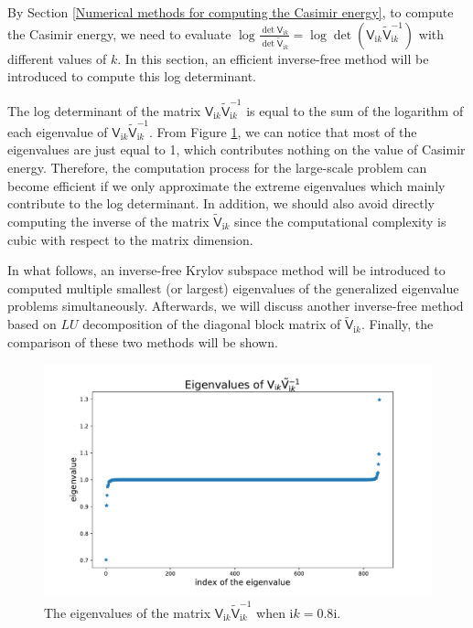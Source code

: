 By Section \ref{Numerical methods for computing the Casimir energy}, to compute the Casimir energy, we need to evaluate 
$\log\frac{\det\mathsf{V}_{\mathrm{i}k}}{\det\tilde{\mathsf{V}}_{\mathrm{i}k}} = \log\det(\mathsf{V}_{\mathrm{i}k}\tilde{\mathsf{V}}_{\mathrm{i}k}^{-1})$ 
with different values of $k$. In this section, an efficient inverse-free method will be introduced to compute this log determinant.

The log determinant of the matrix $\mathsf{V}_{\mathrm{i}k}\tilde{\mathsf{V}}_{\mathrm{i}k}^{-1}$ is equal to the sum of the logarithm of each eigenvalue of 
$\mathsf{V}_{\mathrm{i}k}\tilde{\mathsf{V}}_{\mathrm{i}k}^{-1}$. From Figure \ref{eigenvalues of VVtilde}, we can notice that most of the eigenvalues are just 
equal to 1, which contributes nothing on the value of Casimir energy. Therefore, the computation process for the large-scale problem can become efficient if we only approximate the extreme eigenvalues 
which mainly contribute to the log determinant. In addition, we should also avoid directly computing the inverse of the matrix $\tilde{\mathsf{V}}_{\mathrm{i}k}$
since the computational complexity is cubic with respect to the matrix dimension.

In what follows, an inverse-free Krylov subspace method will be introduced to computed multiple smallest (or largest) eigenvalues of the generalized eigenvalue
problems simultaneously. Afterwards, we will discuss another inverse-free method based on $LU$ decomposition of the diagonal block matrix of $\tilde{\mathsf{V}}_{\mathrm{i}k}$. 
Finally, the comparison of these two methods will be shown.
\begin{figure}[H]
    \centering
    \includegraphics[scale = 0.5]{figures/eigenvalue_of_VVtilde.pdf}
    \caption{The eigenvalues of the matrix $\mathsf{V}_{\mathrm{i}k}\tilde{\mathsf{V}}_{\mathrm{i}k}^{-1}$ when $\mathrm{i}k = 0.8\mathrm{i}$.}
    \label{eigenvalues of VVtilde}
\end{figure}
